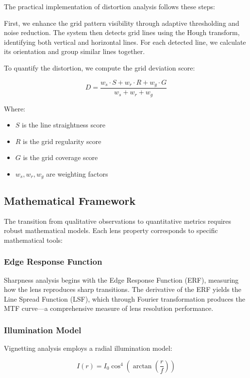 The practical implementation of distortion analysis follows these steps:

First, we enhance the grid pattern visibility through adaptive thresholding and noise reduction. The system then detects grid lines using the Hough transform, identifying both vertical and horizontal lines. For each detected line, we calculate its orientation and group similar lines together.

To quantify the distortion, we compute the grid deviation score:

\begin{equation}
D = \frac{w_s \cdot S + w_r \cdot R + w_g \cdot G}{w_s + w_r + w_g}
\end{equation}

Where:
\begin{itemize}
    \item \( S \) is the line straightness score
    \item \( R \) is the grid regularity score
    \item \( G \) is the grid coverage score
    \item \( w_s, w_r, w_g \) are weighting factors
\end{itemize}

\subsection{Mathematical Framework}
The transition from qualitative observations to quantitative metrics requires robust mathematical models. Each lens property corresponds to specific mathematical tools:

\subsubsection{Edge Response Function}
Sharpness analysis begins with the Edge Response Function (ERF), measuring how the lens reproduces sharp transitions. The derivative of the ERF yields the Line Spread Function (LSF), which through Fourier transformation produces the MTF curve---a comprehensive measure of lens resolution performance.

\subsubsection{Illumination Model}
Vignetting analysis employs a radial illumination model:

\begin{equation}
I(r) = I_0 \cos^4\left(\arctan\left(\frac{r}{f}\right)\right)
\end{equation}

